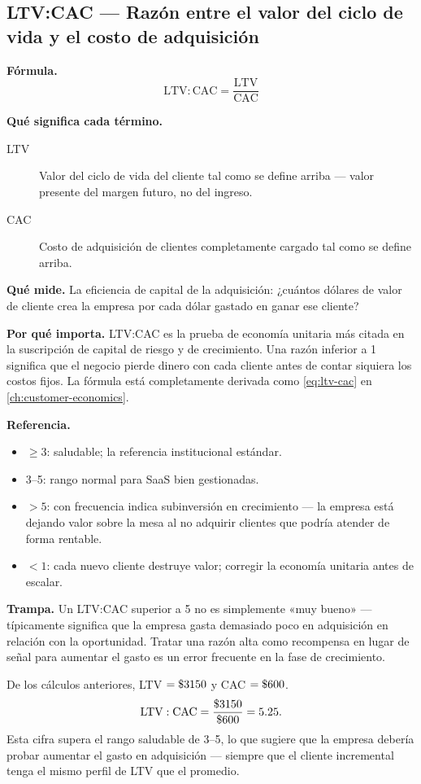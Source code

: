 \subsection{LTV:CAC --- Razón entre el valor del ciclo de vida y el costo de adquisición}

\textbf{Fórmula.}
\[
  \mathrm{LTV:CAC} = \frac{\mathrm{LTV}}{\mathrm{CAC}}
\]

\textbf{Qué significa cada término.}
\begin{description}
  \item[LTV] Valor del ciclo de vida del cliente tal como se define arriba --- valor presente
    del margen futuro, no del ingreso.
  \item[CAC] Costo de adquisición de clientes completamente cargado tal como se define
    arriba.
\end{description}

\textbf{Qué mide.} La eficiencia de capital de la adquisición: ¿cuántos dólares de valor de
cliente crea la empresa por cada dólar gastado en ganar ese cliente?

\textbf{Por qué importa.} LTV:CAC es la prueba de economía unitaria más citada en la
suscripción de capital de riesgo y de crecimiento. Una razón inferior a 1 significa que el
negocio pierde dinero con cada cliente antes de contar siquiera los costos fijos. La fórmula
está completamente derivada como \cref{eq:ltv-cac} en \cref{ch:customer-economics}.

\textbf{Referencia.}
\begin{itemize}
  \item $\ge 3$: saludable; la referencia institucional estándar.
  \item 3--5: rango normal para SaaS bien gestionadas.
  \item $> 5$: con frecuencia indica subinversión en crecimiento --- la empresa está dejando
    valor sobre la mesa al no adquirir clientes que podría atender de forma rentable.
  \item $< 1$: cada nuevo cliente destruye valor; corregir la economía unitaria antes de
    escalar.
\end{itemize}

\textbf{Trampa.} Un LTV:CAC superior a 5 no es simplemente «muy bueno» --- típicamente
significa que la empresa gasta demasiado poco en adquisición en relación con la oportunidad.
Tratar una razón alta como recompensa en lugar de señal para aumentar el gasto es un error
frecuente en la fase de crecimiento.

\begin{example}
De los cálculos anteriores, LTV $= \$\num{3150}$ y CAC $= \$\num{600}$.
\[
  \mathrm{LTV:CAC} = \frac{\$\num{3150}}{\$\num{600}} = 5.25.
\]
Esta cifra supera el rango saludable de 3--5, lo que sugiere que la empresa debería probar
aumentar el gasto en adquisición --- siempre que el cliente incremental tenga el mismo perfil
de LTV que el promedio.
\end{example}


